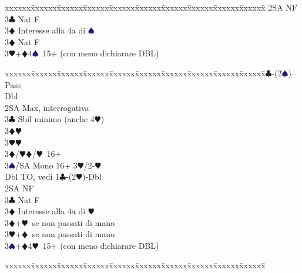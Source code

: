 \documentclass[a4paper,italian]{article}
\newcommand{\BC}{\textcolor{OliveGreen}{$\clubsuit$}}
\newcommand{\BD}{\textcolor{RedOrange}{$\vardiamondsuit$}}
\newcommand{\BH}{\textcolor{Red2}{$\varheartsuit${}}}
\newcommand{\BS}{\textcolor{MidnightBlue}{$\spadesuit${}}}
\newenvironment{bidtable}
{\begin{tabbing}

    xxxxxx\=xxxxxx\=xxxxxx\=xxxxxx\=xxxxxx\=xxxxxx\=xxxxxx\=xxxxxx\=xxxxxx\=xxxxxx\=\kill}
{\end{tabbing} }%
\begin{document}
\begin{multicols}{2}
\begin{bidtable}
                                            2SA \> NF\\
                                            3\BC \> Nat F\+\\
                                            3\BD \> Interesse alla 4a di \BS \-\\
                                            3\BD \> Nat F\\
                                            3\BH {}+\BD 4\BS\ 15+ (con meno dichiarare DBL)\-
                                        \end{bidtable}
                                        \begin{bidtable}
                                            1\BC-(2\BS)--\+\\
                                            Pass\+\\
                                            Dbl\+\\
                                            2SA\> Max, interrogativa\+\\
                                            3\BC\> Sbil minimo (anche 4\BH)\+\\
                                            3\BD{}\BH\\
                                            3\BH{}\BH\-\\
                                            3\BD/\BH{}\BD/\BH\ 16+\\
                                            3\BS/SA\> Mono 16+ 3\BH/2-\BH\-\-\-\\
                                            Dbl \> TO, vedi 1\BC-(2\BH)-Dbl\\
                                            2SA \> NF\\
                                            3\BC \> Nat F\+\\
                                            3\BD \> Interesse alla 4a di \BH \-\\
                                            3\BD {}+\BH\ se non passati di mano\\
                                            3\BH {}+\BD\ se non passati di mano\\
                                            3\BS {}+\BD 4\BH\ 15+ (con meno dichiarare DBL)\-
                                        \end{bidtable}
                                        \begin{bidtable}

\end{bidtable}
\end{multicols}
\end{document}
